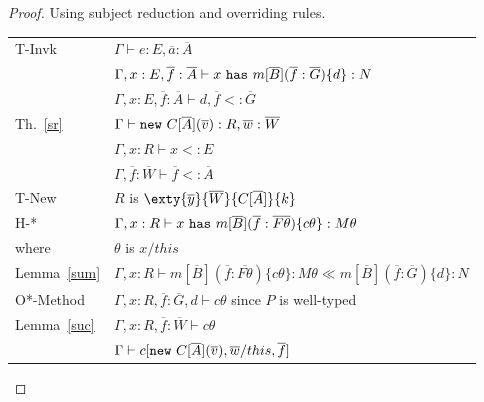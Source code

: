 \begin{proof}Using subject reduction and overriding rules.\\
\begin{tabular}{ll}
{\sc T-Invk} & $\Gamma\vdash e:E, \overline{a}:\overline{A}$
\\
& $\Gamma, x:E,\overline{f}:\overline{A}\vdash x~{\tt has}~m[\overline{B}](\overline{f}:\overline{G})\{d\}:N$
\\
& $\Gamma, x:E,\overline{f}:\overline{A}\vdash d, \overline{f}<:\overline{G}$
\\
Th.~\ref{sr} & $\Gamma \vdash{\tt new}~C[\overline{A}](\overline{v}):R, \overline{w}:\overline{W}$
\\
& $\Gamma, x:R\vdash x<:E$
\\
& $\Gamma, \overline{f}:\overline{W}\vdash \overline{f}<:\overline{A}$
\\
{\sc T-New} & $R$ is $\exty{\overline{y}}{\overline{W}}{C[\overline{A}]}\{k\}$
\\
{\sc H-*} & $\Gamma,x:R\vdash x~{\tt has}~m[\overline{B}](\overline{f}:\overline{F\theta})\{c\theta\}:M\theta$
\\
where & $\theta$ is $x/this$
\\
Lemma~\ref{sum} & $\Gamma,x:R\vdash m[\overline{B}](\overline{f}:\overline{F\theta})\{c\theta\}:M\theta\ll m[\overline{B}](\overline{f}:\overline{G})\{d\}:N$
\\
{\sc O*-Method} & $\Gamma,x:R, \overline{f}:\overline{G}, d\vdash c\theta$ since $P$ is well-typed
\\
Lemma~\ref{suc} & $\Gamma,x:R, \overline{f}:\overline{W} \vdash c\theta$
\\
& $\Gamma\vdash c[{\tt new}~C[\overline{A}](\overline{v}),\overline{w}/this,\overline{f}]$
\end{tabular}

\end{proof}
